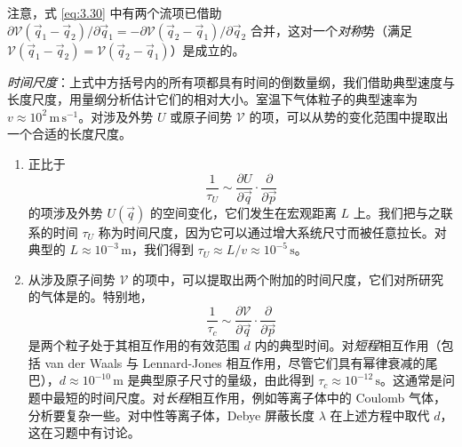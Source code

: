 注意，式 \eqref{eq:3.30} 中有两个流项已借助 $\partial\mathscr V(\vec q_1-\vec q_2)/\partial\vec q_1=-\partial\mathscr V(\vec q_2-\vec q_1)/\partial\vec q_2$ 合并，这对一个\emph{对称}势（满足 $\mathscr V(\vec q_1-\vec q_2)=\mathscr V(\vec q_2-\vec q_1)$）是成立的。

\emph{时间尺度}：上式中方括号内的所有项都具有时间的倒数量纲，我们借助典型速度与长度尺度，用量纲分析估计它们的相对大小。室温下气体粒子的典型速率为 $v\approx10^2\,\mathrm{m\,s^{-1}}$。对涉及外势 $U$ 或原子间势 $\mathscr V$ 的项，可以从势的变化范围中提取出一个合适的长度尺度。

\begin{enumerate}[label=(\alph*),itemsep=0.5em,topsep=0.4em]
  \item 正比于
  \begin{equation*}
    \frac{1}{\tau_U}\sim\frac{\partial U}{\partial\vec q}\cdot\frac{\partial}{\partial\vec p}
  \end{equation*}
  的项涉及外势 $U(\vec q)$ 的空间变化，它们发生在宏观距离 $L$ 上。我们把与之联系的时间 $\tau_U$ 称为时间尺度，因为它可以通过增大系统尺寸而被任意拉长。对典型的 $L\approx10^{-3}\,\mathrm{m}$，我们得到 $\tau_U\approx L/v\approx10^{-5}\,\mathrm{s}$。

  \item 从涉及原子间势 $\mathscr V$ 的项中，可以提取出两个附加的时间尺度，它们对所研究的气体是的。特别地，
  \begin{equation*}
    \frac{1}{\tau_c}\sim\frac{\partial\mathscr V}{\partial\vec q}\cdot\frac{\partial}{\partial\vec p}
  \end{equation*}
  是两个粒子处于其相互作用的有效范围 $d$ 内的典型时间。对\emph{短程}相互作用（包括 van der Waals 与 Lennard-Jones 相互作用，尽管它们具有幂律衰减的尾巴），$d\approx10^{-10}\,\mathrm{m}$ 是典型原子尺寸的量级，由此得到 $\tau_c\approx10^{-12}\,\mathrm{s}$。这通常是问题中最短的时间尺度。对\emph{长程}相互作用，例如等离子体中的 Coulomb 气体，分析要复杂一些。对中性等离子体，Debye 屏蔽长度 $\lambda$ 在上述方程中取代 $d$，这在习题中有讨论。
\end{enumerate}

